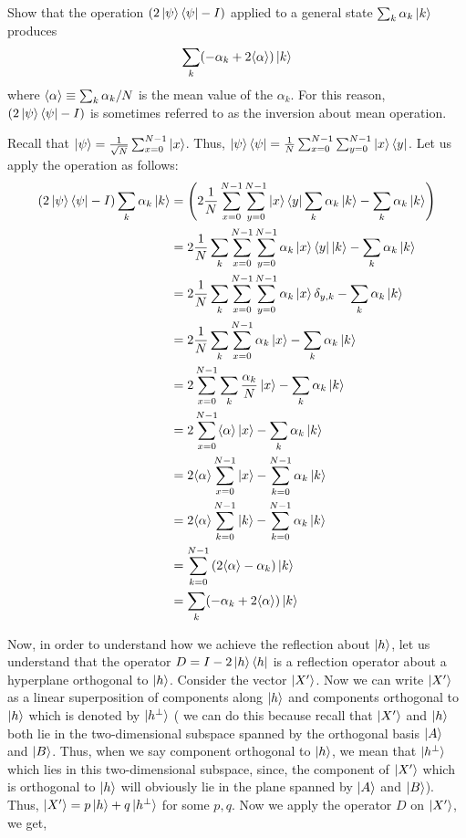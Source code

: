 \begin{example}
Show that the operation $(2\ket{\psi}\bra{\psi}-I)$ applied to a general state $\sum_k \alpha_k\ket{k}$ produces
\[
\sum_k (-\alpha_k+2\langle \alpha \rangle)\ket{k}
\]
where $\braket{\alpha} \equiv \sum_k \alpha_k/N$ is the mean value of the $\alpha_k$. For this reason, $(2\ket{\psi}\bra{\psi}-I)$ is sometimes referred to as the inversion about mean operation.

Recall that $\ket{\psi}=\frac{1}{\sqrt{N}} \sum_{x=0}^{N-1}\ket{x}$. Thus, $\ket{\psi}\bra{\psi} = \frac{1}{N}\sum_{x=0}^{N-1} \sum_{y=0}^{N-1} \ket{x}\bra{y}$. Let us apply the operation as follows:
\begin{align*}
(2\ket{\psi}\bra{\psi}-I)\sum_k \alpha_k\ket{k}&=\left(2\frac{1}{N}\sum_{x=0}^{N-1} \sum_{y=0}^{N-1} \ket{x}\bra{y} \sum_{k} \alpha_k\ket{k}-\sum_k\alpha_k\ket{k}\right)\\
&=2\frac{1}{N}\sum_k \sum_{x=0}^{N-1}\sum_{y=0}^{N-1} \alpha_k \ket{x}\bra{y}\ket{k} -\sum_k \alpha_k \ket{k}\\
&=2\frac{1}{N}\sum_k \sum_{x=0}^{N-1}\sum_{y=0}^{N-1} \alpha_k \ket{x}\delta_{y,k} -\sum_k \alpha_k \ket{k}\\
&=2\frac{1}{N}\sum_k \sum_{x=0}^{N-1} \alpha_k\ket{x} -\sum_k\alpha_k\ket{k}\\
&=2\sum_{x=0}^{N-1}\sum_k \frac{\alpha_k}{N}\ket{x} - \sum_k\alpha_k\ket{k}\\
&=2\sum_{x=0}^{N-1} \langle \alpha \rangle \ket{x}-\sum_k \alpha_k \ket{k}\\ 
&=2\langle \alpha\rangle \sum_{x=0}^{N-1} \ket{x} - \sum_{k=0}^{N-1} \alpha_k \ket{k}\\
&=2\langle \alpha \rangle \sum_{k=0}^{N-1} \ket{k} - \sum_{k=0}^{N-1} \alpha_k\ket{k}\\
&=\sum_{k=0}^{N-1} \left(2\langle \alpha \rangle - \alpha_k \right) \ket{k}\\
&=\sum_k (-\alpha_k +2\langle \alpha \rangle)\ket{k}
\end{align*}
\end{example}
Now, in order to understand how we achieve the reflection about $\ket{h}$, let us understand that the operator $D=I-2\ket{h}\bra{h}$ is a reflection operator about a hyperplane orthogonal to $\ket{h}$. Consider the vector $\ket{X'}$. Now we can write $\ket{X'}$ as a linear superposition of components along $\ket{h}$ and components orthogonal to $\ket{h}$ which is denoted by $\ket{h^{\perp}}$ ( we can do this because recall that $\ket{X'}$ and $\ket{h}$ both lie in the two-dimensional subspace spanned by the orthogonal basis $\ket{A}$ and $\ket{B}$. Thus, when we say component orthogonal to $\ket{h}$, we mean that $\ket{h^{\perp}}$ which lies in this two-dimensional subspace, since, the component of $\ket{X'}$ which is orthogonal to $\ket{h}$ will obviously lie in the plane spanned by $\ket{A}$ and $\ket{B}$). Thus, $\ket{X'}=p\ket{h}+q\ket{h^{\perp}}$ for some $p,q$. Now we apply the operator $D$ on $\ket{X'}$, we get,
